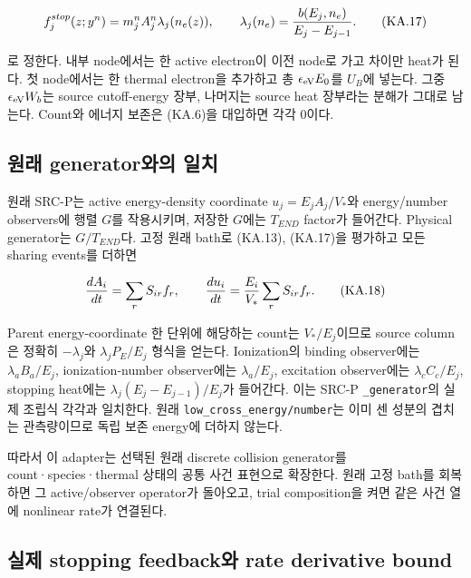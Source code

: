 \documentclass[11pt,a4paper]{article}
\begin{document}
\[
 f_j^{stop}(z;y^n)=m_j^nA_j^n\lambda_j(n_e(z)),\qquad
 \lambda_j(n_e)={b(E_j,n_e)\over E_j-E_{j-1}}.
 \tag{KA.17}
\]

로 정한다. 내부 node에서는 한 active electron이 이전 node로 가고 차이만 heat가 된다. 첫 node에서는 한 thermal electron을 추가하고 총 \(\epsilon_{\rm eV}E_0\)를 \(U_B\)에 넣는다. 그중 \(\epsilon_{\rm eV}W_b\)는 source cutoff-energy 장부, 나머지는 source heat 장부라는 분해가 그대로 남는다. Count와 에너지 보존은 (KA.6)을 대입하면 각각 0이다.

\hypertarget{uxc6d0uxb798-generatoruxc640uxc758-uxc77cuxce58}{%
\subsection{원래 generator와의 일치}\label{uxc6d0uxb798-generatoruxc640uxc758-uxc77cuxce58}}

원래 SRC-P는 active energy-density coordinate \(u_j=E_jA_j/V_*\)와 energy/number observers에 행렬 \(G\)를 작용시키며, 저장한 \(G\)에는 \(T_{END}\) factor가 들어간다. Physical generator는 \(G/T_{END}\)다. 고정 원래 bath로 (KA.13), (KA.17)을 평가하고 모든 sharing events를 더하면

\[
 {dA_i\over dt}=\sum_r S_{ir} f_r,\qquad
 {du_i\over dt}={E_i\over V_*}\sum_r S_{ir} f_r.
 \tag{KA.18}
\]

Parent energy-coordinate 한 단위에 해당하는 count는 \(V_*/E_j\)이므로 source column은 정확히 \(-\lambda_j\)와 \(\lambda_j P_E/E_j\) 형식을 얻는다. Ionization의 binding observer에는 \(\lambda_aB_a/E_j\), ionization-number observer에는 \(\lambda_a/E_j\), excitation observer에는 \(\lambda_cC_c/E_j\), stopping heat에는 \(\lambda_j(E_j-E_{j-1})/E_j\)가 들어간다. 이는 SRC-P \texttt{\_generator}의 실제 조립식 각각과 일치한다. 원래 \texttt{low\_cross\_energy/number}는 이미 센 성분의 겹치는 관측량이므로 독립 보존 energy에 더하지 않는다.

따라서 이 adapter는 선택된 원래 discrete collision generator를 count·species·thermal 상태의 공통 사건 표현으로 확장한다. 원래 고정 bath를 회복하면 그 active/observer operator가 돌아오고, trial composition을 켜면 같은 사건 열에 nonlinear rate가 연결된다.

\hypertarget{uxc2e4uxc81c-stopping-feedbackuxc640-rate-derivative-bound}{%
\subsection{실제 stopping feedback와 rate derivative bound}\label{uxc2e4uxc81c-stopping-feedbackuxc640-rate-derivative-bound}}
\end{document}
